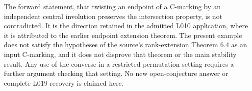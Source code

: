 \documentclass[11pt,a4paper]{article}
\begin{document}
The forward statement, that twisting an endpoint of a C-marking by an independent central involution preserves the intersection property, is not contradicted. It is the direction retained in the admitted L010 application, where it is attributed to the earlier endpoint extension theorem. The present example does not satisfy the hypotheses of the source's rank-extension Theorem 6.4 as an input C-marking, and it does not disprove that theorem or the main stability result. Any use of the converse in a restricted permutation setting requires a further argument checking that setting. No new open-conjecture answer or complete L019 recovery is claimed here.
\end{document}
